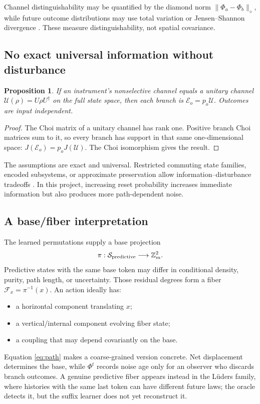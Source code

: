 \documentclass[11pt]{article}
\newtheorem{proposition}[theorem]{Proposition}
\theoremstyle{definition}
\theoremstyle{remark}
\newcommand{\cE}{\mathcal E}
\newcommand{\cU}{\mathcal U}
\newcommand{\Z}{\mathbb Z}
\begin{document}
Channel distinguishability may be quantified by the diamond norm
\(\|\Phi_a-\Phi_b\|_\diamond\), while future outcome distributions may use
total variation or Jensen--Shannon divergence \cite{Watrous2018}. These
measure distinguishability, not spatial covariance.

\subsection{No exact universal information without disturbance}

\begin{proposition}
If an instrument's nonselective channel equals a unitary channel
\(\cU(\rho)=U\rho U^\dagger\) on the full state space, then each branch is
\(\cE_o=p_o\cU\). Outcomes are input independent.
\end{proposition}
\begin{proof}
The Choi matrix of a unitary channel has rank one. Positive branch Choi
matrices sum to it, so every branch has support in that same one-dimensional
space: \(J(\cE_o)=p_oJ(\cU)\). The Choi isomorphism gives the result.
\end{proof}

The assumptions are exact and universal. Restricted commuting state families,
encoded subsystems, or approximate preservation allow information--disturbance
tradeoffs \cite{Holevo2011,Helstrom1976}. In this project, increasing reset
probability increases immediate information but also produces more
path-dependent noise.

\subsection{A base/fiber interpretation}

The learned permutations supply a base projection
\[
\pi:\mathcal S_{\rm predictive}\longrightarrow\Z_m^2.
\]
Predictive states with the same base token may differ in conditional density,
purity, path length, or uncertainty. Those residual degrees form a fiber
\(\mathcal F_x=\pi^{-1}(x)\). An action ideally has:
\begin{itemize}
\item a horizontal component translating \(x\);
\item a vertical/internal component evolving fiber state;
\item a coupling that may depend covariantly on the base.
\end{itemize}

Equation \cref{eq:path} makes a coarse-grained version concrete. Net
displacement determines the base, while \(\Phi^t\) records noise age only for
an observer who discards branch outcomes. A genuine predictive fiber appears
instead in the Lüders family, where histories with the same last token can
have different future laws; the oracle detects it, but the suffix learner does
not yet reconstruct it.
\end{document}
